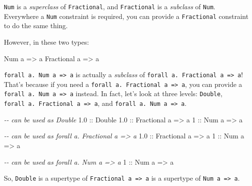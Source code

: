\documentclass[]{article}
\newenvironment{Shaded}{}{}
\newcommand{\CommentTok}[1]{\textcolor[rgb]{0.38,0.63,0.69}{\textit{#1}}}
\newcommand{\DataTypeTok}[1]{\textcolor[rgb]{0.56,0.13,0.00}{#1}}
\newcommand{\DecValTok}[1]{\textcolor[rgb]{0.25,0.63,0.44}{#1}}
\newcommand{\FloatTok}[1]{\textcolor[rgb]{0.25,0.63,0.44}{#1}}
\newcommand{\NormalTok}[1]{#1}
\newcommand{\OtherTok}[1]{\textcolor[rgb]{0.00,0.44,0.13}{#1}}
\begin{document}
\texttt{Num} is a \emph{superclass} of \texttt{Fractional}, and
\texttt{Fractional} is a \emph{subclass} of \texttt{Num}. Everywhere a
\texttt{Num} constraint is required, you can provide a \texttt{Fractional}
constraint to do the same thing.

However, in these two types:

\begin{Shaded}
\begin{Highlighting}[]
\DataTypeTok{Num}\NormalTok{ a }\OtherTok{=\textgreater{}}\NormalTok{ a}
\DataTypeTok{Fractional}\NormalTok{ a }\OtherTok{=\textgreater{}}\NormalTok{ a}
\end{Highlighting}
\end{Shaded}

\texttt{forall\ a.\ Num\ a\ =\textgreater{}\ a} is actually a \emph{subclass} of
\texttt{forall\ a.\ Fractional\ a\ =\textgreater{}\ a}! That's because if you
need a \texttt{forall\ a.\ Fractional\ a\ =\textgreater{}\ a}, you can provide a
\texttt{forall\ a.\ Num\ a\ =\textgreater{}\ a} instead. In fact, let's look at
three levels: \texttt{Double},
\texttt{forall\ a.\ Fractional\ a\ =\textgreater{}\ a}, and
\texttt{forall\ a.\ Num\ a\ =\textgreater{}\ a}.

\begin{Shaded}
\begin{Highlighting}[]
\CommentTok{{-}{-} can be used as \textasciigrave{}Double\textasciigrave{}}
\FloatTok{1.0}\OtherTok{ ::} \DataTypeTok{Double}
\FloatTok{1.0}\OtherTok{ ::} \DataTypeTok{Fractional}\NormalTok{ a }\OtherTok{=\textgreater{}}\NormalTok{ a}
\DecValTok{1}\OtherTok{ ::} \DataTypeTok{Num}\NormalTok{ a }\OtherTok{=\textgreater{}}\NormalTok{ a}

\CommentTok{{-}{-} can be used as \textasciigrave{}forall a. Fractional a =\textgreater{} a\textasciigrave{}}
\FloatTok{1.0}\OtherTok{ ::} \DataTypeTok{Fractional}\NormalTok{ a }\OtherTok{=\textgreater{}}\NormalTok{ a}
\DecValTok{1}\OtherTok{ ::} \DataTypeTok{Num}\NormalTok{ a }\OtherTok{=\textgreater{}}\NormalTok{ a}

\CommentTok{{-}{-} can be used as \textasciigrave{}forall a. Num a =\textgreater{} a\textasciigrave{}}
\DecValTok{1}\OtherTok{ ::} \DataTypeTok{Num}\NormalTok{ a }\OtherTok{=\textgreater{}}\NormalTok{ a}
\end{Highlighting}
\end{Shaded}

So, \texttt{Double} is a supertype of \texttt{Fractional\ a\ =\textgreater{}\ a}
is a supertype of \texttt{Num\ a\ =\textgreater{}\ a}.
\end{document}
